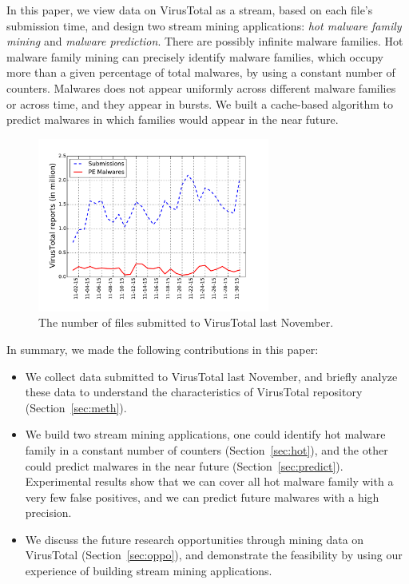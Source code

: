 
In this paper, we view data on VirusTotal as a stream, based on each file’s submission time, and design two stream mining applications: 
\textit{hot malware family mining} and \textit{malware prediction}. 
There are possibly infinite malware families. 
Hot malware family mining can precisely identify malware families, 
which occupy more than a given percentage of total malwares, by using a constant number of counters.
Malwares does not appear uniformly across different malware families or across time, 
and they appear in bursts. 
We built a cache-based algorithm to predict malwares in which families would appear in the near future. 

\begin{figure}[t!]
\begin{center}
\includegraphics[width=3.0in]{figure/nov}
\caption{The number of files submitted to VirusTotal last November. }
\label{fig:subnum}
\end{center}
\end{figure}

In summary, we made the following contributions in this paper:

\begin{itemize}

\item We collect data submitted to VirusTotal last November, 
and briefly analyze these data to understand the characteristics of VirusTotal repository (Section~\ref{sec:meth}). 
\item We build two stream mining applications, one could identify hot malware family in a constant number of counters (Section~\ref{sec:hot}), 
and the other could predict malwares in the near future (Section~\ref{sec:predict}). 
Experimental results show that we can cover all hot malware family with a very few false positives, and we can predict future malwares with a high precision.
\item We discuss the future research opportunities through mining data on VirusTotal (Section~\ref{sec:oppo}), 
and demonstrate the feasibility by using our experience of building stream mining applications. 

\end{itemize}



